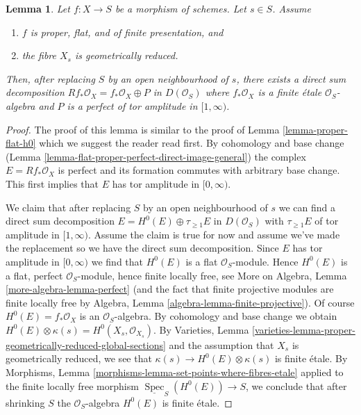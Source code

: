 \documentclass{stacks-project}
\theoremstyle{plain}
\newtheorem{lemma}[subsection]{Lemma}
\theoremstyle{definition}
\theoremstyle{remark}
\numberwithin{equation}{subsection}
\def\Spec{\mathop{\mathrm{Spec}}}
\begin{document}
\begin{lemma}
\label{lemma-proper-flat-geom-red}
Let $f : X \to S$ be a morphism of schemes. Let $s \in S$. Assume
\begin{enumerate}
\item $f$ is proper, flat, and of finite presentation, and
\item the fibre $X_s$ is geometrically reduced.
\end{enumerate}
Then, after replacing $S$ by an open neighbourhood of $s$, there
exists a direct sum decomposition
$Rf_*\mathcal{O}_X = f_*\mathcal{O}_X \oplus P$
in $D(\mathcal{O}_S)$ where $f_*\mathcal{O}_X$ is a finite \'etale
$\mathcal{O}_S$-algebra and
$P$ is a perfect of tor amplitude in $[1, \infty)$.
\end{lemma}

\begin{proof}
The proof of this lemma is similar to the proof of
Lemma \ref{lemma-proper-flat-h0}
which we suggest the reader read first.
By cohomology and base change
(Lemma \ref{lemma-flat-proper-perfect-direct-image-general})
the complex $E = Rf_*\mathcal{O}_X$
is perfect and its formation commutes with arbitrary base change.
This first implies that $E$ has tor amplitude in $[0, \infty)$.

\medskip\noindent
We claim that after replacing $S$ by an open neighbourhood of
$s$ we can find a direct sum decomposition
$E = H^0(E) \oplus \tau_{\geq 1}E$ in $D(\mathcal{O}_S)$
with $\tau_{\geq 1}E$ of tor amplitude in $[1, \infty)$.
Assume the claim is true for now and assume we've made the replacement
so we have the direct sum decomposition.
Since $E$ has tor amplitude in $[0, \infty)$ we find that
$H^0(E)$ is a flat $\mathcal{O}_S$-module.
Hence $H^0(E)$ is a flat, perfect $\mathcal{O}_S$-module,
hence finite locally free, see
More on Algebra, Lemma \ref{more-algebra-lemma-perfect}
(and the fact that finite projective modules are finite locally free by
Algebra, Lemma \ref{algebra-lemma-finite-projective}).
Of course $H^0(E) = f_*\mathcal{O}_X$ is an $\mathcal{O}_S$-algebra.
By cohomology and base change we obtain
$H^0(E) \otimes \kappa(s) = H^0(X_s, \mathcal{O}_{X_s})$.
By Varieties, Lemma
\ref{varieties-lemma-proper-geometrically-reduced-global-sections}
and the assumption that $X_s$ is geometrically reduced, we
see that $\kappa(s) \to H^0(E) \otimes \kappa(s)$
is finite \'etale. By Morphisms, Lemma
\ref{morphisms-lemma-set-points-where-fibres-etale}
applied to the finite locally free morphism
$\underline{\Spec}_S(H^0(E)) \to S$,
we conclude that after shrinking $S$ the $\mathcal{O}_S$-algebra
$H^0(E)$ is finite \'etale.


\end{proof}
\end{document}
